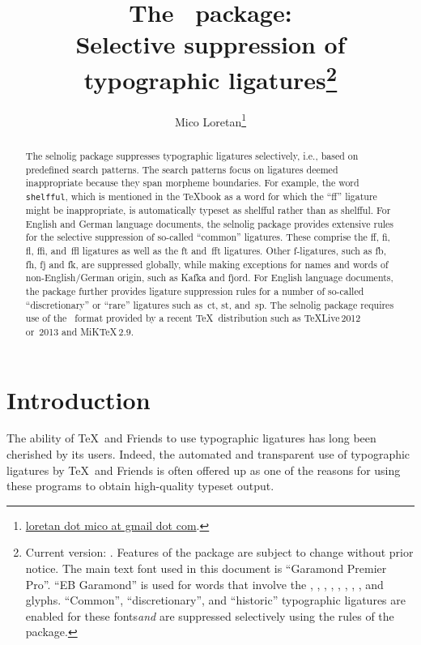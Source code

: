 \documentclass[11pt]{article}
\title{The \selnoligpackagename\ package: \\
Selective suppression of typographic ligatures\thanks{
Current version: \selnoligpackageversion. Features of the \pkg{selnolig} package are subject to change without prior notice. 
\newline\hspace*{\parindent}
The main text font used in this document is \enquote{Garamond Premier Pro}. \enquote{\ebg EB Garamond} is used for words that involve the \emph{\uselig{sk}}, {\ebg\uselig{fb}}, {\ebg\uselig{fh}}, {\ebg\uselig{fj}}, {\ebg\uselig{fk}}, \uselig{ffb}, \uselig{ffh}, \uselig{ffj}, and \uselig{ffk} glyphs. \enquote{Common}, \enquote{discretionary}, and \enquote{historic} typographic ligatures are enabled for these fonts\textemdash \emph{and} are suppressed selectively using the rules of the \pkg{selnolig} package.}}
\author{Mico Loretan\thanks{
\href{mailto:loretan.mico@gmail.com}{loretan dot mico at gmail dot com}.}}
\date{\selnoligpackagedate}
\newcommand{\pkg}[1]{\textsf{#1}}
\newcommand{\opt}[1]{\texttt{#1}}
\newcommand{\uselig}[1]{\selnoligoff\mbox{#1}\selnoligon}
\begin{document}
\VerbatimFootnotes
{}
\maketitle


\begin{abstract}

The \pkg{selnolig} package suppresses typographic ligatures selectively, i.e., based on predefined search patterns. The search patterns focus on ligatures deemed inappropriate because they span morpheme boundaries. For example, the word \opt{shelfful}, which is mentioned in the \TeX book as a word for which the \enquote{ff} ligature might be inappropriate, is automatically typeset as shelfful rather than as shel\mbox{ff}ul.
\newline\hspace*{\parindent}
For English and German language documents, the \pkg{selnolig} package provides extensive rules for the selective suppression of so-called \enquote{common} ligatures. These comprise the ff, fi, fl, ffi, and~ffl ligatures as well as the ft and~fft ligatures. Other f-ligatures, such as {\ebg\uselig{fb}, \uselig{fh}, \uselig{fj}} and {\ebg\uselig{fk}}, are suppressed globally, while making exceptions for names and words of non-English/German origin, such as {\ebg Kafka} and {\ebg fjord}.
\newline\hspace*{\parindent}
For English language documents, the package further provides ligature suppression rules for a number of so-called \enquote{discretionary} or \enquote{rare} ligatures such as~ct, st, and~sp.
\newline\hspace*{\parindent}
The \pkg{selnolig} package requires use of the \LuaLaTeX\ format provided by a recent \TeX\ distribution such as \TeX Live\,2012 or~2013 and MiK\TeX\,2.9.
\end{abstract}

\tableofcontents

\clearpage
{}

\section{Introduction}

The ability of \TeX\ and Friends to use typographic ligatures has long been cherished by its users. Indeed, the automated and transparent use of typographic ligatures by \TeX\ and Friends is often offered up as one of the reasons for using these programs to obtain high-quality typeset output.
\end{document}
